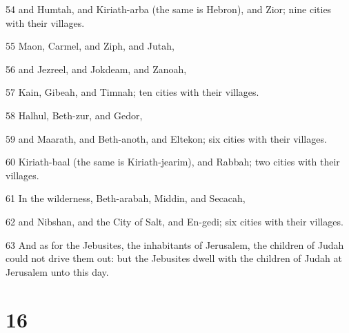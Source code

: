 \par 54 and Humtah, and Kiriath-arba (the same is Hebron), and Zior; nine cities with their villages.
\par 55 Maon, Carmel, and Ziph, and Jutah,
\par 56 and Jezreel, and Jokdeam, and Zanoah,
\par 57 Kain, Gibeah, and Timnah; ten cities with their villages.
\par 58 Halhul, Beth-zur, and Gedor,
\par 59 and Maarath, and Beth-anoth, and Eltekon; six cities with their villages.
\par 60 Kiriath-baal (the same is Kiriath-jearim), and Rabbah; two cities with their villages.
\par 61 In the wilderness, Beth-arabah, Middin, and Secacah,
\par 62 and Nibshan, and the City of Salt, and En-gedi; six cities with their villages.
\par 63 And as for the Jebusites, the inhabitants of Jerusalem, the children of Judah could not drive them out: but the Jebusites dwell with the children of Judah at Jerusalem unto this day.

\chapter{16}

